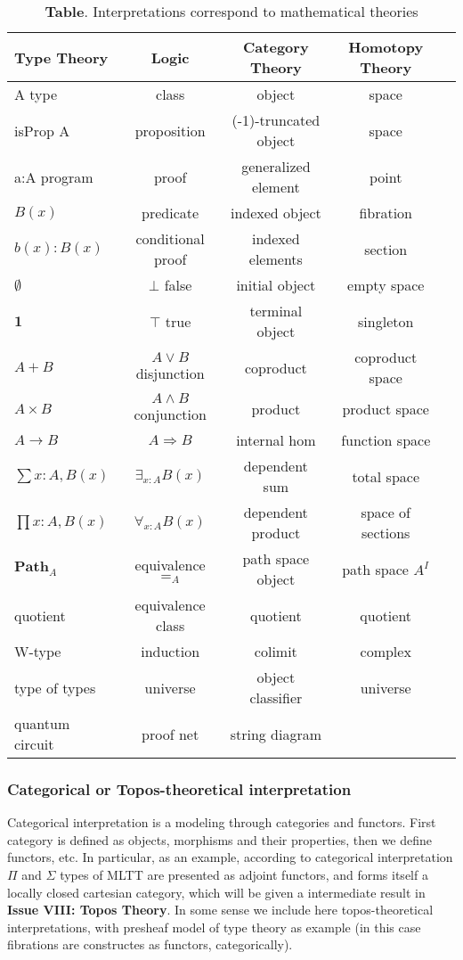 \documentclass[twoside]{article}
\theoremstyle{definition}
\begin{document}
\begin{table}[!ht]
  \centering
  \caption*{\textbf{Table}. Interpretations correspond to mathematical theories}
 \begin{tabular}{lcccc}
    \hline
       Type Theory & Logic & Category Theory & Homotopy Theory\\
    \hline
       A type & class & object & space \\
       isProp A & proposition & (-1)-truncated object & space \\
       a:A program & proof & generalized element & point \\
       $B(x)$ & predicate & indexed object & fibration \\
       $b(x) : B(x)$ & conditional proof & indexed elements & section\\
       $\emptyset$ & $\bot$ false & initial object & empty space \\
       $\mathbf{1}$ & $\top$ true & terminal object & singleton \\
       $A + B$ & $A\vee B$ disjunction & coproduct & coproduct space \\
       $A\times B$ & $A\wedge B$ conjunction & product & product space \\
       $A\to B$ & $A\Rightarrow B$ & internal hom & function space \\
       $\sum{x:A},B(x)$ & $\exists_{x:A}B(x)$ & dependent sum & total space \\
       $\prod{x:A},B(x)$ & $\forall_{x:A}B(x)$ & dependent product & space of sections\\
       $\mathbf{Path}_{A}$ & equivalence $=_A$ & path space object & path space $A^I$ \\
       quotient & equivalence class & quotient & quotient \\
       W-type & induction & colimit & complex\\
       type of types & universe & object classifier & universe \\
       quantum circuit & proof net & string diagram & \\
      \hline
  \end{tabular}
\end{table}

\subsubsection{Categorical or Topos-theoretical interpretation}

Categorical interpretation\cite{Curien14} is a modeling through categories and functors.
First category is defined as objects, morphisms and their properties, then
we define functors, etc. In particular, as an example, according to categorical
interpretation $\Pi$ and $\Sigma$ types of MLTT are presented as adjoint
functors, and forms itself a locally closed cartesian category, which will be given a
intermediate result in {\bf Issue VIII: Topos Theory}. In some sense we include here
topos-theoretical interpretations, with presheaf model of type theory as
example (in this case fibrations are constructes as functors, categorically).
\end{document}
